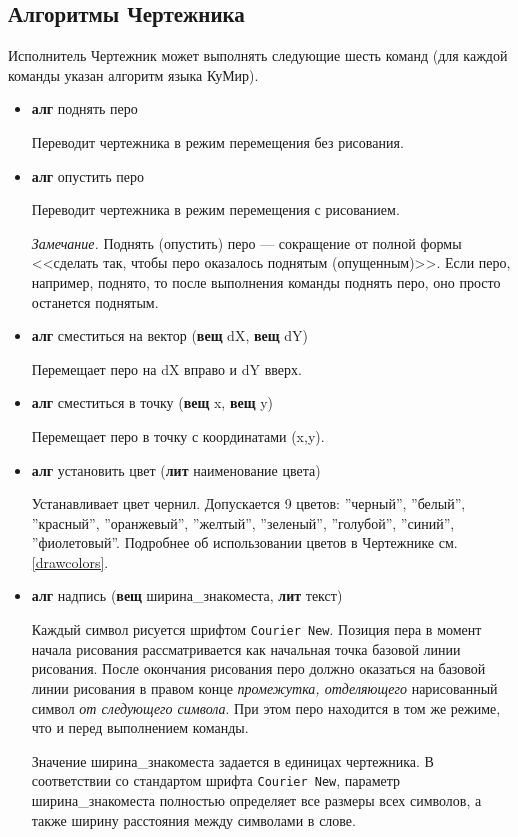 \subsection{Алгоритмы Чертежника}
\label{drawcommands}

Исполнитель Чертежник может выполнять следующие шесть команд (для каждой команды указан алгоритм языка КуМир).

\begin{itemize}
\item \textbf{алг} поднять перо

Переводит чертежника в режим перемещения без рисования.

\item \textbf{алг} опустить перо

Переводит чертежника в режим перемещения с рисованием.

\emph{Замечание.} Поднять (опустить) перо --- сокращение от полной формы <<сделать так, чтобы перо оказалось поднятым (опущенным)>>. Если перо, например, поднято, то после выполнения команды \textsf{поднять перо}, оно просто останется поднятым.

\item \textbf{алг} сместиться на вектор (\textbf{вещ} dX, \textbf{вещ} dY)

Перемещает перо на dX вправо и dY вверх.

\item \textbf{алг} сместиться в точку (\textbf{вещ} x, \textbf{вещ} y)

Перемещает перо в точку с координатами (x,y).

\item \textbf{алг} установить цвет (\textbf{лит} наименование цвета)
\label{drawsetcolor}

Устанавливает цвет чернил. Допускается 9 цветов: ''черный'', ''белый'', ''красный'', \mbox{''оранжевый''}, ''желтый'', ''зеленый'', ''голубой'', ''синий'', ''фиолетовый''. Подробнее об использовании цветов в Чертежнике см. \ref{drawcolors}.

\item \textbf{алг} надпись (\textbf{вещ} ширина\_знакоместа, \textbf{лит} текст)

Каждый символ рисуется шрифтом \texttt{Courier New}. Позиция пера в момент начала рисования рассматривается как начальная точка базовой линии рисования.  После окончания рисования перо должно оказаться на базовой линии рисования в правом конце \emph{промежутка, отделяющего} нарисованный символ \emph{от следующего символа}. При этом перо находится в том же режиме, что и перед выполнением команды.

Значение \textsf{ширина\_знакоместа} задается в единицах чертежника. В соответствии со стандартом шрифта \texttt{Courier New}, параметр \textsf{ширина\_знакоместа} полностью определяет все размеры всех символов, а также ширину расстояния между символами в слове.
\end{itemize}

